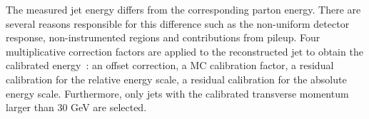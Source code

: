 The measured jet energy differs from the corresponding parton energy. There are several reasons responsible for this difference such as the non-uniform detector response, non-instrumented regions and contributions from pileup. Four multiplicative correction factors are applied to the reconstructed jet to obtain the calibrated energy~\cite{JME2011}: an offset correction, a MC calibration factor, a residual calibration for the relative energy scale, a residual calibration for the absolute energy scale.
Furthermore, only jets with the calibrated transverse momentum larger than 30 GeV are selected.

